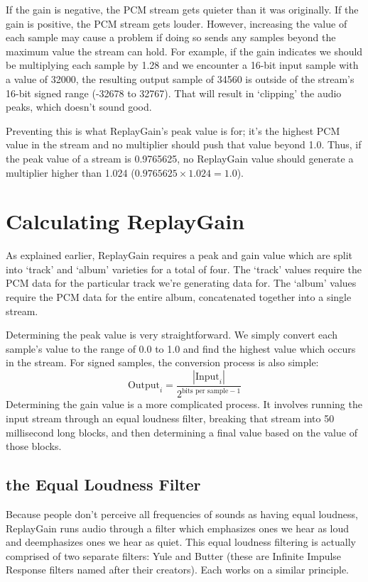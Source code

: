 If the gain is negative, the PCM stream gets quieter than it was
originally.
If the gain is positive, the PCM stream gets louder.
However, increasing the value of each sample may cause a problem
if doing so sends any samples beyond the maximum value the stream
can hold.
For example, if the gain indicates we should be multiplying each sample
by 1.28 and we encounter a 16-bit input sample with a value of 32000,
the resulting output sample of 34560 is outside of the stream's
16-bit signed range (-32678 to 32767).
That will result in `clipping' the audio peaks, which doesn't sound good.

Preventing this is what ReplayGain's peak value is for;
it's the highest PCM value in the stream and no multiplier should push
that value beyond 1.0.
Thus, if the peak value of a stream is 0.9765625, no ReplayGain value
should generate a multiplier higher than 1.024
($0.9765625 \times 1.024 = 1.0$).

\clearpage

\section{Calculating ReplayGain}

As explained earlier, ReplayGain requires a peak and gain value
which are split into `track' and `album' varieties for a total of four.
The `track' values require the PCM data for the particular track
we're generating data for.
The `album' values require the PCM data for the entire album,
concatenated together into a single stream.

Determining the peak value is very straightforward.
We simply convert each sample's value to the range of 0.0 to 1.0
and find the highest value which occurs in the stream.
For signed samples, the conversion process is also simple:
\begin{equation}
\text{Output}_i = \frac{| \text{Input}_i |}{2 ^ {\text{bits per sample} - 1}}
\end{equation}
Determining the gain value is a more complicated process.
It involves running the input stream through an equal loudness filter,
breaking that stream into 50 millisecond long blocks, and then
determining a final value based on the value of those blocks.

\subsection{the Equal Loudness Filter}
Because people don't perceive all frequencies of sounds as having
equal loudness, ReplayGain runs audio through a filter which
emphasizes ones we hear as loud and deemphasizes ones we hear as quiet.
This equal loudness filtering is actually comprised of two separate
filters: Yule and Butter (these are Infinite Impulse Response filters
named after their creators).
Each works on a similar principle.

